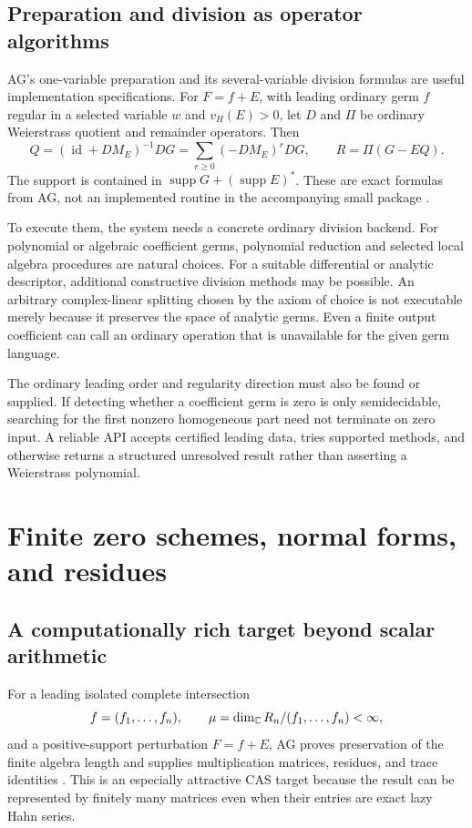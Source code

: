 \documentclass[11pt,letterpaper]{article}
\theoremstyle{definition}\newtheorem{definition}[theorem]{Definition}
\theoremstyle{remark}\newtheorem{remark}[theorem]{Remark}
\newcommand{\supp}{\operatorname{supp}}\newcommand{\lc}{\operatorname{lc}}
\newcommand{\id}{\operatorname{id}}\newcommand{\vH}{v_{\!H}}
\numberwithin{equation}{section}\setcounter{tocdepth}{2}
\begin{document}
\subsection{Preparation and division as operator algorithms}
AG's one-variable preparation and its several-variable division formulas are useful implementation specifications. For $F=f+E$, with leading ordinary germ $f$ regular in a selected variable $w$ and $v_H(E)>0$, let $D$ and $\Pi$ be ordinary Weierstrass quotient and remainder operators. Then
\begin{equation}\label{eq:weierstrassalgorithm}
 Q=(\id+D M_E)^{-1}DG
 =\sum_{r\ge0}(-D M_E)^rDG,\qquad
 R=\Pi(G-EQ).
\end{equation}
The support is contained in $\supp G+(\supp E)^*$. These are exact formulas from AG, not an implemented routine in the accompanying small package \cite{AG}.

To execute them, the system needs a concrete ordinary division backend. For polynomial or algebraic coefficient germs, polynomial reduction and selected local algebra procedures are natural choices. For a suitable differential or analytic descriptor, additional constructive division methods may be possible. An arbitrary complex-linear splitting chosen by the axiom of choice is not executable merely because it preserves the space of analytic germs. Even a finite output coefficient can call an ordinary operation that is unavailable for the given germ language.

The ordinary leading order and regularity direction must also be found or supplied. If detecting whether a coefficient germ is zero is only semidecidable, searching for the first nonzero homogeneous part need not terminate on zero input. A reliable API accepts certified leading data, tries supported methods, and otherwise returns a structured unresolved result rather than asserting a Weierstrass polynomial.

\section{Finite zero schemes, normal forms, and residues}\label{sec:finitealgebra}
\subsection{A computationally rich target beyond scalar arithmetic}
For a leading isolated complete intersection
\[
 f=(f_1,\ldots,f_n),\qquad
 \mu=\dim_\mathbb C R_n/(f_1,\ldots,f_n)<\infty,
\]
and a positive-support perturbation $F=f+E$, AG proves preservation of the finite algebra length and supplies multiplication matrices, residues, and trace identities \cite{AG}. This is an especially attractive CAS target because the result can be represented by finitely many matrices even when their entries are exact lazy Hahn series.
\end{document}
